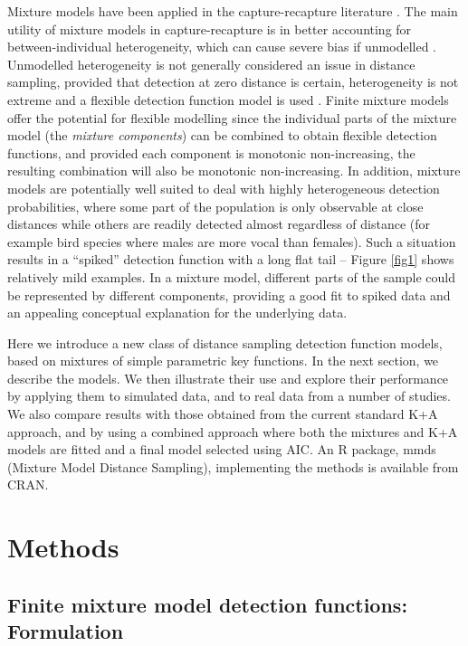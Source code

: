 \documentclass[10pt]{article}
\begin{document}
Mixture models have been applied in the capture-recapture literature \cite{Pledger:2000tc, Dorazio:2003uf, Pledger:2005wy, Morgan:2008wy}. The main utility of mixture models in capture-recapture is in better accounting for between-individual heterogeneity, which can cause severe bias if unmodelled \cite{Link:2003wo}. Unmodelled heterogeneity is not generally considered an issue in distance sampling, provided that detection at zero distance is certain, heterogeneity is not extreme and a flexible detection function model is used \cite[Section 11.12]{Buckland:2004ts}. Finite mixture models offer the potential for flexible modelling since the individual parts of the mixture model (the \textit{mixture components}) can be combined to obtain flexible detection functions, and provided each component is monotonic non-increasing, the resulting combination will also be monotonic non-increasing. In addition, mixture models are potentially well suited to deal with highly heterogeneous detection probabilities, where some part of the population is only observable at close distances while others are readily detected almost regardless of distance (for example bird species where males are more vocal than females). Such a situation results in a ``spiked'' detection function with a long flat tail -- Figure \ref{fig1} shows relatively mild examples. In a mixture model, different parts of the sample could be represented by different components, providing a good fit to spiked data and an appealing conceptual explanation for the underlying data.

Here we introduce a new class of distance sampling detection function models, based on mixtures of simple parametric key functions.  In the next section, we describe the models.  We then illustrate their use and explore their performance by applying them to simulated data, and to real data from a number of studies. We also compare results with those obtained from the current standard K+A approach, and by using a combined approach where both the mixtures and K+A models are fitted and a final model selected using AIC. An R package, mmds \cite{mmds} (Mixture Model Distance Sampling), implementing the methods is available from CRAN.

\section*{Methods}

\subsection*{Finite mixture model detection functions: Formulation}
\end{document}
